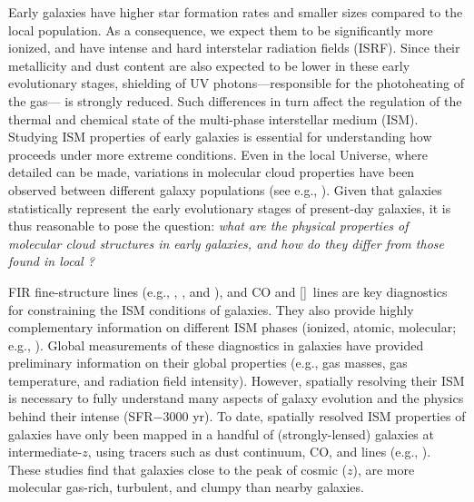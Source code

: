 \IfFileExists{emulateapjlegacy.cls}{\documentclass[iop]{emulateapjlegacy}}{\documentclass[iop]{emulateapj}}
\newcommand{\DL}[1]{({\bf \color{dlcolor} DL: #1})}
\newcommand{\MM}[1]{({\bf \color{mmcolor} MM: #1})}
\begin{document}
Early galaxies have higher star formation rates \citep[SFR; ][]{Behroozi13b, Sparre15a, Maiolino15a, Dunlop17a} and smaller sizes \citep[e.g.,][]{Bouwens11a, Ono13a} compared to the local population. 
%
As a consequence, we expect them to be significantly more ionized, and have intense and hard interstelar radiation fields (ISRF). Since their metallicity and dust content are also expected to be lower in these early evolutionary stages, shielding of UV photons---responsible for the photoheating of the gas---  is strongly reduced. Such differences in turn affect the regulation of the thermal and chemical state of the multi-phase interstellar medium (ISM). Studying ISM properties of early galaxies is essential for understanding how \SF proceeds under more extreme conditions.
%
Even in the local Universe, where detailed \obs can be made, variations in molecular cloud 
properties have been observed between different galaxy populations (see e.g., \citealt{Hughes10a, Hughes13b}).  Given that \highz galaxies statistically represent the early evolutionary stages of present-day galaxies, it is thus reasonable to pose the question: {\it what are the physical properties of 
molecular cloud structures in early galaxies, and how do they differ from those found in local \galpop?}
%

FIR fine-structure lines (e.g., \cii, \nii, and \oiii), and CO and [\ci]~lines are key diagnostics for constraining the ISM conditions of galaxies. They also provide highly complementary information on different ISM phases (ionized, atomic, molecular; e.g., \citealt{Scoville74a, Rubin85a, Malhotra01a}).
%
Global measurements of these diagnostics in \highz galaxies have provided preliminary information on their global properties (e.g., gas masses, gas temperature, and radiation field intensity). However, spatially resolving their ISM is necessary to fully understand many aspects of galaxy evolution and the physics behind their intense \SF (SFR$-$3000\,\Msun\,yr\pmOne).
%
To date, spatially resolved ISM properties of \highz galaxies have only been mapped in a handful of (strongly-lensed) galaxies at intermediate-$z$, using tracers such as dust continuum, CO, and \cii lines (e.g., \citealt{Swinbank11a, Hodge15a, Ferkinhoff15a, Hodge16a, Leung19a}). These studies find that galaxies close to the peak of cosmic \SF ($z$), are more molecular gas-rich, turbulent, and clumpy than nearby galaxies.
\end{document}
